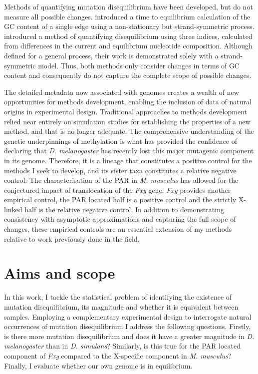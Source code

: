 Methods of quantifying mutation disequilibrium have been developed, but do not measure all possible changes. \cite{Singh2009StrongDrosophila} introduced a time to equilibrium calculation of the GC content of a single \gls{edge} using a non-stationary but strand-symmetric process. \cite{Squartini2008QuantifyingProcess} introduced a method of quantifying disequilibrium using three indices, calculated from differences in the current and equilibrium nucleotide composition. Although defined for a general process, their work is demonstrated solely with a strand-symmetric model. Thus, both methods only consider changes in terms of GC content and consequently do not capture the complete scope of possible changes.

The detailed metadata now associated with genomes creates a wealth of new opportunities for methods development, enabling the inclusion of data of natural origins in experimental design. Traditional approaches to methods development relied near entirely on simulation studies for establishing the properties of a new method, and that is no longer adequate. The comprehensive understanding of the genetic underpinnings of methylation is what has provided the confidence of declaring that \textit{D. melanogaster} has recently lost this major mutagenic component in its genome. Therefore, it is a lineage that constitutes a positive control for the methods I seek to develop, and its sister taxa constitutes a relative negative control. The characterisation of the PAR in \textit{M. musculus} has allowed for the conjectured impact of translocation of the \textit{Fxy} gene. \textit{Fxy} provides another empirical control, the PAR located half is a positive control and the strictly X-linked half is the relative negative control. In addition to demonstrating consistency with asymptotic approximations and capturing the full scope of changes, these empirical controls are an essential extension of my methods relative to work previously done in the field. 

\section{Aims and scope}

In this work, I tackle the statistical problem of identifying the existence of mutation disequilibrium, its magnitude and whether it is equivalent between samples. Employing a complementary experimental design to interrogate natural occurrences of mutation disequilibrium I address the following questions. Firstly, is there more mutation disequilibrium and does it have a greater magnitude in \textit{D. melanogaster} than in \textit{D. simulans}? Similarly, is this true for the PAR located component of \textit{Fxy} compared to the X-specific component in \textit{M. musculus}? Finally, I evaluate whether our own genome is in equilibrium. 

